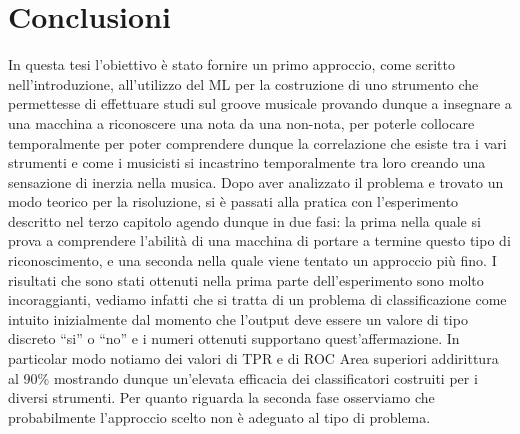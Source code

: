 \chapter*{Conclusioni}
In questa tesi l'obiettivo è stato fornire un primo approccio, come scritto nell'introduzione, all'utilizzo del ML per la costruzione di uno strumento che permettesse di effettuare studi sul groove musicale provando dunque a insegnare a una macchina a riconoscere una nota da una non-nota, per poterle collocare temporalmente per poter comprendere dunque la correlazione che esiste tra i vari strumenti e come i musicisti si incastrino temporalmente tra loro creando una sensazione di inerzia nella musica. Dopo aver analizzato il problema e trovato un modo teorico per la risoluzione, si è passati alla pratica con l'esperimento descritto nel terzo capitolo agendo dunque in due fasi: la prima nella quale si prova a comprendere l'abilità di una macchina di portare a termine questo tipo di riconoscimento, e una seconda nella quale viene tentato un approccio più fino. I risultati che sono stati ottenuti nella prima parte dell'esperimento sono molto incoraggianti, vediamo infatti che si tratta di un problema di classificazione come intuito inizialmente dal momento che l'output deve essere un valore di tipo discreto ``si'' o ``no'' e i numeri ottenuti supportano quest'affermazione. In particolar modo notiamo dei valori di TPR e di ROC Area superiori addirittura al 90\% mostrando dunque un'elevata efficacia dei classificatori costruiti per i diversi strumenti. Per quanto riguarda la seconda fase osserviamo che probabilmente l'approccio scelto non è adeguato al tipo di problema. %